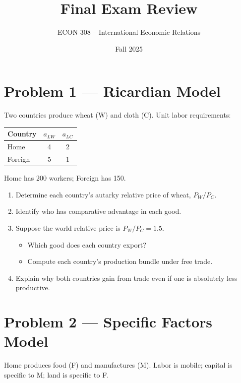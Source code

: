 \documentclass[12pt]{article}
\title{Final Exam Review}
\author{ECON 308 -- International Economic Relations}
\date{Fall 2025}
\begin{document}
\maketitle


\section*{Problem 1 — Ricardian Model}

Two countries produce wheat (W) and cloth (C). Unit labor requirements:

\begin{center}
\begin{tabular}{lcc}
\toprule
Country & $a_{LW}$ & $a_{LC}$ \\
\midrule
Home & 4 & 2 \\
Foreign & 5 & 1 \\
\bottomrule
\end{tabular}
\end{center}

Home has 200 workers; Foreign has 150.

\begin{enumerate}[label=(\arabic*)]
\item Determine each country's autarky relative price of wheat, $P_W/P_C$.
\item Identify who has comparative advantage in each good.
\item Suppose the world relative price is $P_W/P_C = 1.5$.
    \begin{itemize}
        \item Which good does each country export?
        \item Compute each country's production bundle under free trade.
    \end{itemize}
\item Explain why both countries gain from trade even if one is absolutely less productive.
\end{enumerate}


\section*{Problem 2 — Specific Factors Model}

Home produces food (F) and manufactures (M). Labor is mobile; capital is specific to M; land is specific to F.
\end{document}
